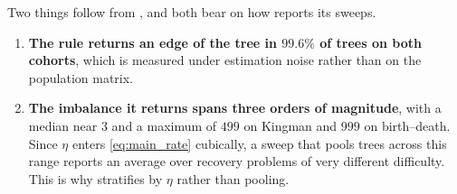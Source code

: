 \noindent Two things follow from , and both bear on how 
reports its sweeps.

\begin{enumerate}[leftmargin=2em, itemsep=3pt, topsep=3pt]
\item \textbf{The rule returns an edge of the tree in $99.6\%$ of trees on both cohorts}, which
      is  measured under estimation noise rather than on the population
      matrix.
\item \textbf{The imbalance it returns spans three orders of magnitude}, with a median near $3$ and
      a maximum of $499$ on Kingman and $999$ on birth--death. Since $\eta$ enters
      \eqref{eq:main_rate} cubically, a sweep that pools trees across this range reports an average
      over recovery problems of very different difficulty. This is why 
      stratifies by $\eta$ rather than pooling.
\end{enumerate}
